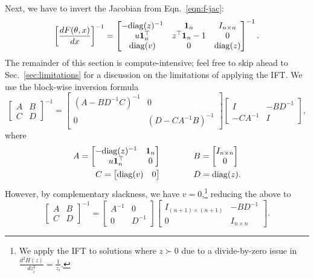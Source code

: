 \documentclass[11pt]{article}
\begin{document}
Next, we have to invert the Jacobian from Eqn.~\ref{eqn:f-jac}:
\begin{equation}
\label{eqn:dsystem-matrix}
\left[\frac{dF(\theta,x)}{dx}\right]^{-1} = \begin{bmatrix}
-\mathrm{diag}(z)^{-1} & \mathbf{1}_n & I_{n\times n} \\
u\mathbf{1}_n^\top & z^\top\mathbf{1}_n - 1 & 0\\
\mathrm{diag}(v) & 0 & \mathrm{diag}(z)
\end{bmatrix}^{-1}.
\end{equation}
The remainder of this section is compute-intensive;
feel free to skip ahead to Sec.~\ref{sec:limitations} for a discussion
on the limitations of applying the IFT.
We use the block-wise inversion formula
\begin{equation*}
\begin{bmatrix}
A & B\\
C & D
\end{bmatrix}^{-1} = \begin{bmatrix}
    (A - BD^{-1}C)^{-1} & 0\\
    0 & (D - CA^{-1}B)^{-1}
\end{bmatrix}
\begin{bmatrix}
    I & -BD^{-1}\\
    -CA^{-1} & I
\end{bmatrix},
\end{equation*}
where
\begin{align*}
A = \begin{bmatrix} -\mathrm{diag}(z)^{-1} & \mathbf{1}_n \\ u\mathbf{1}_n^\top & 0 \end{bmatrix}&\qquad\qquad
B = \begin{bmatrix}I_{n\times n} \\ 0\end{bmatrix}\\
C = \begin{bmatrix}\mathrm{diag}(v) & 0\end{bmatrix} &\qquad\qquad
D = \mathrm{diag}(z).
\end{align*}
However, by complementary slackness, we have $v = 0$,\footnote{
We apply the IFT to solutions where $z\succ 0$ due to a divide-by-zero issue
in $\frac{d^2H(z)}{dz_i^2} = \frac{1}{z_i}$.
}
reducing the above to
\begin{equation*}
\begin{bmatrix}
A & B\\
C & D
\end{bmatrix}^{-1} = \begin{bmatrix}
    A^{-1} & 0\\
    0 & D^{-1}
\end{bmatrix}
\begin{bmatrix}
    I_{(n+1)\times (n+1)} & -BD^{-1}\\
    0 & I_{n \times n}
\end{bmatrix}.
\end{equation*}
\end{document}

